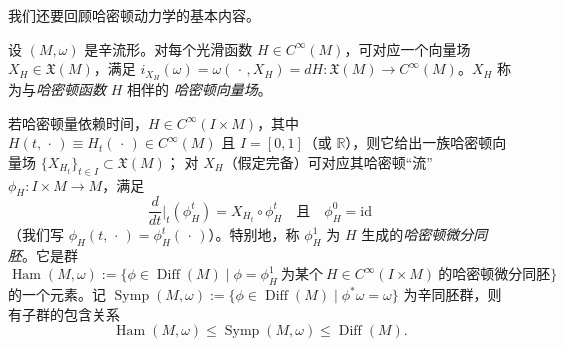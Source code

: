 我们还要回顾哈密顿动力学的基本内容。

\begin{Def}\label{def:5.4}
设 $(M,\omega)$ 是辛流形。对每个光滑函数 $H\in C^\infty(M)$，可对应一个向量场
$X_H\in\mathfrak X(M)$，满足 $i_{X_H}(\omega)=\omega(\,\cdot\,,X_H)=dH:
\mathfrak X(M)\to C^\infty(M)$。$X_H$ 称为与\emph{哈密顿函数} $H$ 相伴的
\emph{哈密顿向量场}。
\end{Def}

若哈密顿量依赖时间，$H\in C^\infty(I\times M)$，其中
$H(t,\,\cdot\,)\equiv H_t(\,\cdot\,)\in C^\infty(M)$ 且 $I=[0,1]$（或
$\mathbb R$），则它给出一族哈密顿向量场 $\{X_{H_t}\}_{t\in I}\subset\mathfrak X(M)$；
对 $X_H$（假定完备）可对应其哈密顿“流” $\phi_H:I\times M\to M$，满足
\[
\frac{d}{dt}\Big|_t(\phi_H^t)=X_{H_t}\circ\phi_H^t
\quad\text{且}\quad \phi_H^0=\mathrm{id}
\]
（我们写 $\phi_H(t,\,\cdot\,)=\phi_H^t(\,\cdot\,)$）。特别地，称 $\phi_H^1$ 为
$H$ 生成的\emph{哈密顿微分同胚}。它是群
\[
\operatorname{Ham}(M,\omega):=\{\phi\in\operatorname{Diff}(M)\mid
\phi=\phi_H^1\ \text{为某个}\ H\in C^\infty(I\times M)\ \text{的哈密顿微分同胚}\}
\]
的一个元素。记 $\operatorname{Symp}(M,\omega):=\{\phi\in\operatorname{Diff}(M)\mid
\phi^*\omega=\omega\}$ 为辛同胚群，则有子群的包含关系
\[
\operatorname{Ham}(M,\omega)\le\operatorname{Symp}(M,\omega)\le
\operatorname{Diff}(M).
\]

